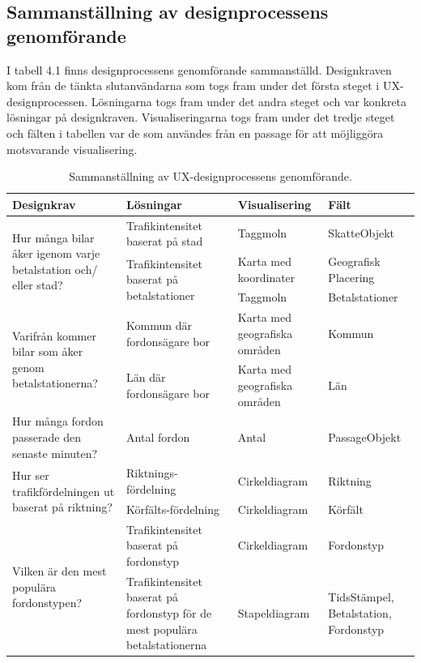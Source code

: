 \documentclass[12pt]{kththesis}
\begin{document}
\subsection{Sammanställning av designprocessens genomförande}
I tabell 4.1 finns designprocessens genomförande sammanställd. Designkraven kom från de tänkta slutanvändarna som togs fram under det första steget i UX-designprocessen. Lösningarna togs fram under det andra steget och var konkreta lösningar på designkraven. Visualiseringarna togs fram under det tredje steget och fälten i tabellen var de som användes från en passage för att möjliggöra motsvarande visualisering.

\begin{table}[h!]
  \begin{center}
  \caption{Sammanställning av UX-designprocessens genomförande.}
    \label{tab:table1}
 \begin{tabular}{|p{3cm}|p{3cm}|p{3cm}|p{3cm}|}
      \hline
     \textbf{Designkrav} & \textbf{Lösningar} & \textbf{Visualisering} & \textbf{Fält}\\
     \hline
  \multirow{3}{3cm}{Hur många bilar åker igenom varje betalstation och/ eller stad?} &  Trafikintensitet baserat på stad & Taggmoln  & SkatteObjekt\\\cline{2-4}
  & \multirow{2}{3cm}{Trafikintensitet baserat på betalstationer} & Karta med koordinater
& Geografisk Placering\\\cline{3-4}  
  & &  Taggmoln
& Betalstationer \\ \hline


  \multirow{2}{3cm}{Varifrån kommer bilar som åker genom betalstationerna?} &  Kommun där fordonsägare bor & Karta med geografiska områden  & Kommun\\\cline{2-4}
  &Län där fordonsägare bor
 & Karta med geografiska områden  & Län\\ \hline
 
Hur många fordon passerade den senaste minuten? &Antal fordon
 & Antal  & PassageObjekt\\ \hline
 
 \multirow{2}{3cm}{Hur ser trafikfördelningen ut baserat på riktning?} &  Riktnings-fördelning&Cirkeldiagram& Riktning\\\cline{2-4}
  &Körfälts-fördelning 
 & Cirkeldiagram  & Körfält\\ \hline
 
 \multirow{2}{3cm}{Vilken är den mest populära fordonstypen?} &  Trafikintensitet baserat på fordonstyp & Cirkeldiagram& Fordonstyp\\\cline{2-4}
  &Trafikintensitet baserat på fordonstyp för de mest populära betalstationerna 
 & Stapeldiagram  & TidsStämpel, Betalstation, Fordonstyp\\ \hline

\end{tabular}
\end{center}
\end{table}
\end{document}
